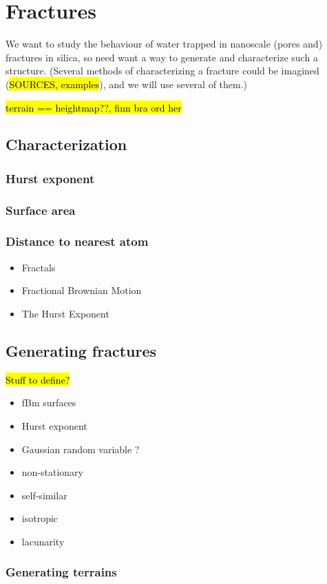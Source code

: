 \chapter{Fractures}

We want to study the behaviour of water trapped in nanoscale (pores and) fractures in silica, so need want a way to generate and characterize such a structure. (Several methods of characterizing a fracture could be imagined (\hl{SOURCES, examples}), and we will use several of them.)        

\hl{terrain == heightmap??, finn bra ord her}

\section{Characterization}
\subsection{Hurst exponent}
\subsection{Surface area}
\subsection{Distance to nearest atom}
\begin{itemize}
    \item Fractals
    \item Fractional Brownian Motion
    \item The Hurst Exponent
\end{itemize}

\section{Generating fractures}
\hl{Stuff to define?}
\begin{itemize}
    \item fBm surfaces
    \item Hurst exponent
    \item Gaussian random variable ?
    \item non-stationary
    \item self-similar
    \item isotropic
    \item lacunarity
\end{itemize}

\subsection{Generating terrains}

